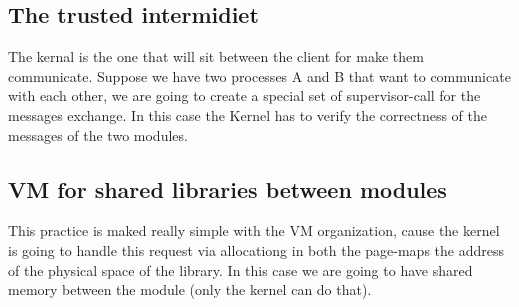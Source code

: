 \documentclass{article}
\begin{document}
    \subsection{The trusted intermidiet}
      The kernal is the one that will sit between the client for make them communicate.
      Suppose we have two processes A and B that want to communicate with each other, we
      are going to create a special set of supervisor-call for the messages exchange. In this
      case the Kernel has to verify the correctness of the messages of the two modules.
    \subsection{VM for shared libraries between modules} This practice is maked really simple 
      with the VM organization, cause the kernel is going to handle this request via
      allocationg in both the page-maps the address of the physical space of the library.
      In this case we are going to have shared memory between the module (only the kernel
      can do that).
\end{document}

